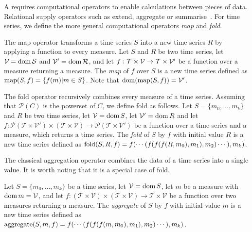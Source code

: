 A  requires computational operators to enable calculations
between pieces of data. Relational  supply operators such
as extend, aggregate or summarise~\cite{date:introduction}. For time
series, we define the more general computational operators \emph{map}
and \emph{fold}.

The map operator transforms a time series $S$ into a new time series
$R$ by applying a function to every measure.  Let $S$ and $R$ be two
time series, let $\cal{V}=\operatorname{dom} S$ and $\cal{V'}=\operatorname{dom} R$, and let
$f:\cal{T}\times\cal{V}\rightarrow\cal{T}\times\cal{V'}$ be a function
over a measure returning a measure. The \emph{map} of $f$ over $S$ is
a new time series defined as $\operatorname*{map}(S,f)=\{f(m)|m\in S\}$. Note that
$\operatorname{dom}(\operatorname*{map}(S,f))=\cal{V'}$.

The fold operator recursively combines every measure of a time
series. Assuming that $\mathcal{P}(C)$ is the powerset of $C$, we
define fold as follows.
%
Let $S=\{m_0,\dots, m_k\}$ and $R$ be two time series, let
$\mathcal{V}=\operatorname{dom} S$, let $\mathcal{V'}=\operatorname{dom} R$ and let
%
$f:\mathcal{P}(\mathcal{T}\times\mathcal{V'}) \times (\mathcal{T}\times\mathcal{V}) \rightarrow \mathcal{P}(\mathcal{T}\times\mathcal{V'})$ 
%
be a function over a time series and a measure, which returns a time
series.
%
The \emph{fold} of $S$ by $f$ with initial value $R$ is a new time
series defined as $\operatorname*{fold}(S,R,f) = f(\cdots(f(f(f(R,m_0),\allowbreak
m_1),\allowbreak m_2)\cdots),\allowbreak m_k)$.
%

The classical aggregation operator combines the data of a time series
into a single value.  It is worth noting that it is a special case of
fold.

Let $S=\{m_0,\dots,m_k\}$ be a time series, let $\mathcal{V}=\operatorname{dom} S$,
let $m$ be a measure with $\operatorname{dom} m=\mathcal{V}$, and let
%
$f:(\mathcal{T}\times\mathcal{V})\times(\mathcal{T}\times\mathcal{V})\rightarrow
\mathcal{T}\times\mathcal{V}$ be a function over two measures
returning a measure. The \emph{aggregate} of $S$ by $f$ with initial
value $m$ is a new time series defined as $\operatorname*{aggregate}(S,m,f) =
f(\cdots(f(f(f(m,m_0),\allowbreak m_1),\allowbreak
m_2)\cdots),\allowbreak m_k)$.


